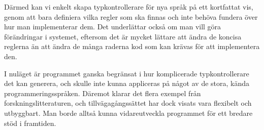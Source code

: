 \documentclass{popsci}
\begin{document}
{Därmed kan vi enkelt skapa typkontrollerare för nya språk på ett kortfattat vis, genom att bara definiera vilka regler som ska finnas och inte behöva fundera över hur man implementerar dem.
Det underlättar också om man vill göra förändringar i systemet, eftersom det är mycket lättare att ändra de koncisa reglerna än att ändra de många raderna kod som kan krävas för att implementera den.

I nuläget är programmet ganska begränsat i hur komplicerade typkontrollerare det kan generera, och skulle inte kunna appliceras på något av de stora, kända programmeringsspråken.
Däremot klarar det flera exempel från forskningslitteraturen, och tillvägagångssättet har dock visats vara flexibelt och utbyggbart.
Man borde alltså kunna vidareutveckla programmet för ett bredare stöd i framtiden.


}
\end{document}
